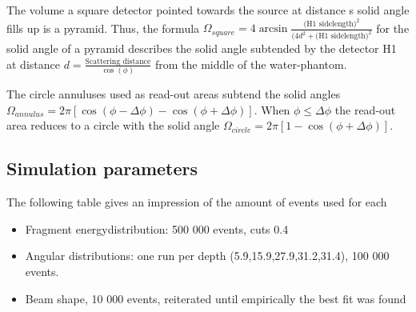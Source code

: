 The volume a square detector pointed towards the source at distance s solid angle fills up is a pyramid. Thus, the formula $\Omega_{square} = 4 \arcsin{\frac{\text{(H1 sidelength)}^2}{(4d^2+\text{(H1 sidelength)}^2}}$ for the solid angle of a pyramid describes the solid angle subtended by the detector H1 at distance $d = \frac{\text{Scattering distance}}{\cos(\phi)}$ from the middle of the water-phantom.

The circle annuluses used as read-out areas subtend the solid angles $\Omega_{annulus} = 2 \pi [\cos(\phi - \Delta\phi) - \cos(\phi + \Delta\phi)]$. When $\phi \le \Delta\phi$ the read-out area reduces to a circle with the solid angle $\Omega_{circle} = 2 \pi [1 - \cos(\phi + \Delta\phi)]$.




\subsection{Simulation parameters}
The following table gives an impression of the amount of events used for each
\begin{itemize}
 \item Fragment energydistribution: 500 000 events, cuts 0.4
 \item Angular distributions: one run per depth (5.9,15.9,27.9,31.2,31.4), 100 000 events.
 \item Beam shape, 10 000 events, reiterated until empirically the best fit was found
\end{itemize}

